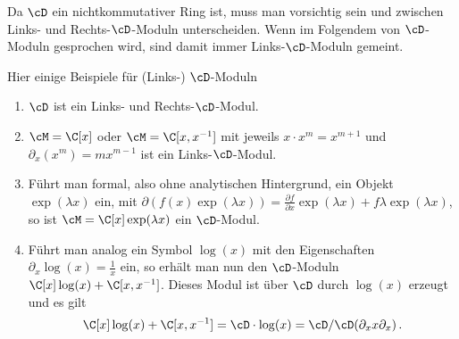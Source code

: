 Da $\cD$ ein nichtkommutativer Ring ist, muss man vorsichtig sein und zwischen
Links- und Rechts-$\cD$-Moduln unterscheiden.
Wenn im Folgendem von $\cD$-Moduln gesprochen wird, sind damit immer
Links-$\cD$-Moduln gemeint.

\begin{exmp}
Hier einige Beispiele für (Links-) $\cD$-Moduln
\begin{enumerate}
%
\item $\cD$ ist ein Links- und Rechts-$\cD$-Modul.
%
\item $\cM=\C[x]$ oder $\cM=\C[x,x^{-1}]$ mit jeweils $x\cdot x^{m}=x^{m+1}$
und $\partial_x(x^m)=mx^{m-1}$ ist ein Links-$\cD$-Modul.
%
\item Führt man formal, also ohne analytischen Hintergrund, ein Objekt
$\exp(\lambda x)$ ein, mit $\partial(f(x)\exp(\lambda x))=\frac{\partial
f}{\partial x}\exp(\lambda x)+f\lambda\exp(\lambda x)$, so ist
$\cM=\C[x]\exp(\lambda x)$ ein $\cD$-Modul.
%
\begin{comment}
\cite[Exmp 2.2]{ArkhipovDmod}
\end{comment}
\item Führt man analog ein Symbol $\log(x)$ mit den Eigenschaften
$\partial_x\log(x)=\frac{1}{x}$ ein, so erhält man nun den $\cD$-Moduln
$\C[x]\log(x)+\C[x,x^{-1}]$. Dieses Modul ist über $\cD$ durch $\log(x)$
erzeugt und es gilt
\[
\C[x]\log(x)+\C[x,x^{-1}]=\cD\cdot\log(x)=\cD\slash\cD(\partial_x x\partial_x) \,.
\]
\begin{comment}
TODO: prüfen
\end{comment}
\begin{comment}
\cite[Exmp 3.1.4]{ginzburg}
\end{comment}
\end{enumerate}
\end{exmp}

\begin{comment}
\begin{lem}\cite[Lem 2.3.3.]{sabbah_cimpa90}
Sei $\cM$ ein Links-$\cD$-Modul von endlichem Typ, welches auch von endlichem
Typ über $\Ckx$ ist. Dann ist $\cM$ bereits ein freies $\C\{x\}$-Modul.
\end{lem}
\begin{proof}
Siehe \cite[Lem 2.3.3.]{sabbah_cimpa90}.
\end{proof}
\begin{cor} \cite[Cor 2.3.4.]{sabbah_cimpa90}
Falls $\cM$ ein Links-$\cD$-Modul von endlichem Typ, welches außerdem ein
endlich dimensionaler Vektorraum ist, so ist schon $\cM=\{0\}$.
\end{cor}
\end{comment}

